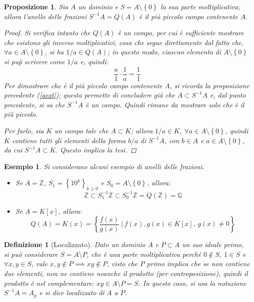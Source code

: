 \documentclass[12pt]{scrartcl}
\theoremstyle{style}
\newtheorem{esempio}{Esempio}[section]
\newtheorem{definizione}{Definizione}[section]
\newtheorem{prop}{Proposizione}[section]
\numberwithin{equation}{subsection}
\begin{document}
\begin{prop}
	Sia $A$ un dominio e $S = A \setminus\left\{ 0 \right\} $ la sua parte moltiplicativa; allora l'anello delle frazioni $S^{-1}A=Q(A)$ \`e il pi\`u piccolo campo contenente $A$.
	\begin{proof}
		Si verifica intanto che $Q(A)$ \`e un campo, per cui \`e sufficiente mostrare che esistono gli inverso moltiplicativi, cosa che segue direttamente dal fatto che, $\forall a \in A \setminus \left\{ 0 \right\} $, si ha $1 / a \in Q(A)$; in questo modo, ciascun elemento di $A\setminus\left\{ 0 \right\} $ si pu\`p scrivere come $1 / a$ e, quindi:
		\[
		\frac{a}{1}\cdot \frac{1}{a} = \frac{1}{1}
		\] 
		Per dimostrare che \`e il pi\`u piccolo campo contenente $A$, si ricorda la proposizione precedente (\ref{aext}); questa permette di concludere gi\`a che $A \subset S^{-1}A$ e, dal punto precedente, si sa che $S^{-1}A$ \`e un campo.
		Quindi rimane da mostrare solo che \`e il pi\`u piccolo.

		Per farlo, sia $K$ un campo tale che $A \subset K$; allora $1 / a \in K , \ \forall a \in A \setminus\left\{ 0 \right\} $, quindi $K$ contiene tutti gli elementi della forma $b / a$ di $S^{-1}A$, con $b \in A$ e $a \in A \setminus\left\{ 0 \right\} $, da cui $S^{-1}A \subset K$.
		Questo implica la tesi.
	\end{proof}
\end{prop}
\begin{esempio}
	Si considerano alcuni esempio di anelli delle frazioni.
	\begin{itemize}
		\item Se $A = \mathbb{Z}$, $S_1 = \left\{ 10^k \right\} _{k\ge 0} $ e $S_0 = A \setminus\left\{ 0 \right\} $, allora:
			\[
			\mathbb{Z} \subset S_1^{-1}\mathbb{Z}\subset S_0^{-1}\mathbb{Z}= Q(\mathbb{Z}) =  \mathbb{Q}
			\] 
		\item Se $A = K[x]$, allora:
			\[
				Q(A)= K(x) = \left\{ \frac{f(x)}{g(x)}\ \bigg\lvert \ f(x) , g(x) \in K[x]  , \ g(x) \neq 0\right\}
			\] 
	\end{itemize}
\end{esempio}
\begin{definizione}
	[Localizzato]
		Dato un dominio $A$ e $P \subset A$ un suo ideale primo, si pu\`o considerare $S = A\setminus P$, che \`e una parte moltiplicativa perch\'e $0 \not \in S, \ 1 \in S$ e $\forall x,y \in S$, vale $x,y \not \in P \implies xy \not \in P$, visto che $P$ primo implica che se non contiene due elementi, non ne contiene neanche il prodotto (per controposizione), quindi il prodotto \`e nel complementare: $xy \in A \setminus P = S$.
			In questo caso, si usa la notazione $S^{-1}A = A_p$ e si dice \textit{localizzato} di $A$ a $P$.
\end{definizione}
\end{document}
